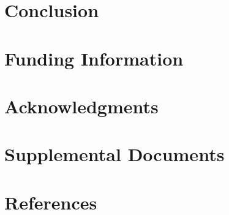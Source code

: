 \documentclass[9pt,twocolumn,twoside]{idsi}
\begin{document}
\section{Conclusion}

\section*{Funding Information}

\section*{Acknowledgments}

\section*{Supplemental Documents}

\section*{References}
\end{document}
